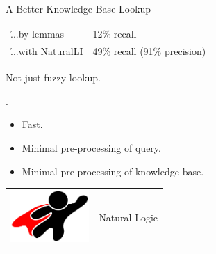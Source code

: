 \begin{frame}{A Better Knowledge Base Lookup}
  \\
  \vspace{0.25cm}
  \begin{tabular}{ll}
    \h{...by lemmas} & 12\% recall \\
    \h{...with NaturalLI} & 49\% recall (91\% precision)
  \end{tabular}
  \vspace{0.25cm}
  \pause

   Not just fuzzy lookup.
  \vspace{0.25cm}
  \pause
  
  .
  \begin{itemize}
    \item Fast.
    \item Minimal pre-processing of query.
    \item Minimal pre-processing of knowledge base.
  \end{itemize}
  \vspace{0.25cm}
  \pause

  \begin{center}
    \begin{tabular}{rl}
      \multicolumn{1}{m{3cm}}{\includegraphics[width=3cm]{../../img/superhero.pdf}} &
      \huge{Natural Logic}
    \end{tabular}
  \end{center}
\end{frame}


